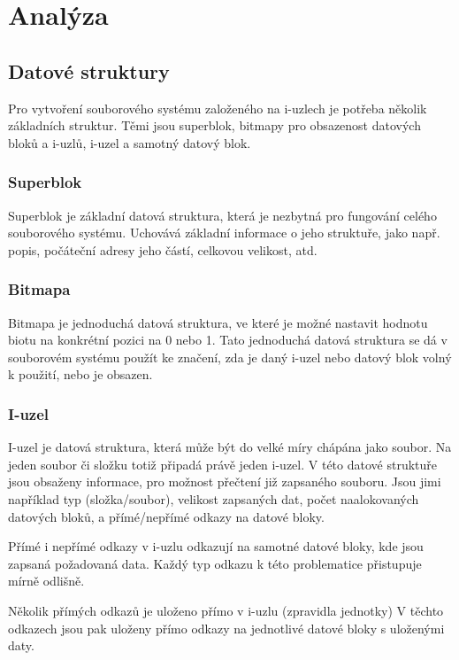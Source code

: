 \documentclass[12pt, a4paper]{article}
\begin{document}
    

    \section{Analýza}
    \subsection{Datové struktury}
    Pro vytvoření souborového systému založeného na i-uzlech je potřeba několik základních struktur.
    Těmi jsou superblok, bitmapy pro obsazenost datových bloků a i-uzlů, i-uzel a samotný datový blok.


    \subsubsection{Superblok}
    Superblok je základní datová struktura, která je nezbytná pro fungování celého souborového systému.
    Uchovává základní informace o jeho struktuře, jako např. popis, počáteční adresy jeho částí, celkovou velikost, atd.

    \subsubsection{Bitmapa}
    Bitmapa je jednoduchá datová struktura, ve které je možné nastavit hodnotu biotu na konkrétní pozici na 0 nebo 1.
    Tato jednoduchá datová struktura se dá v souborovém systému použít ke značení, zda je daný i-uzel nebo datový blok volný k použití, nebo je obsazen.

    \subsubsection{I-uzel}
    I-uzel je datová struktura, která může být do velké míry chápána jako soubor.
    Na jeden soubor či složku totiž připadá právě jeden i-uzel.
    V této datové struktuře jsou obsaženy informace, pro možnost přečtení již zapsaného souboru.
    Jsou jimi například typ (složka/soubor), velikost zapsaných dat, počet naalokovaných datových bloků, a přímé/nepřímé odkazy na datové bloky.

    Přímé i nepřímé odkazy v i-uzlu odkazují na samotné datové bloky, kde jsou zapsaná požadovaná data.
    Každý typ odkazu k této problematice přistupuje mírně odlišně.

    Několik přímých odkazů je uloženo přímo v i-uzlu (zpravidla jednotky)
    V těchto odkazech jsou pak uloženy přímo odkazy na jednotlivé datové bloky s uloženými daty.
\end{document}
